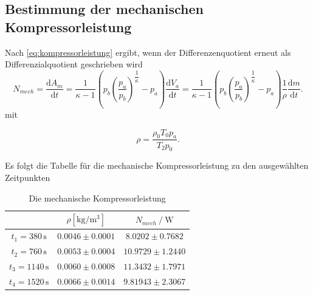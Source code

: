 \subsection{Bestimmung der mechanischen Kompressorleistung}

Nach \eqref{eq:kompressorleistung} ergibt, wenn der Differenzenquotient erneut als Differenzialquotient geschrieben wird
\begin{equation}
N_{mech}= \dfrac{\text{d}A_m}{\text{d}t} = \dfrac{1}{κ-1} \left(p_b\left(\dfrac{p_a}{p_b}\right)^{\dfrac{1}{κ}}-p_a\right) \dfrac{\text{d}V_a}{\text{d}t} = 
    \dfrac{1}{κ-1} \left (p_b \left(\dfrac{p_a}{p_b} \right)^{\dfrac{1}{κ}}-p_a \right) \dfrac{1}{ρ}\dfrac{\text{d}m}{\text{d}t}.
\end{equation}
mit 

\begin{equation*}
\rho = \dfrac{\rho_0 T_0 p_a}{T_2 p_0}.
\end{equation*}

Es folgt die Tabelle für die mechanische Kompressorleistung zu den ausgewählten Zeitpunkten
\begin{table}[H]
  \centering
  \label{tab:kompressorleistung2}
  \begin{tabular}{S S S}
    \toprule
    & {$\rho \left[\unit{\kilo\gram\per\cubic\meter}\right]$}&{$N_{mech} \mathbin{/} \unit{\watt}$} \\
    \midrule
    {$t_1 = 380  \, \unit{\second}$} & {$0.0046 \pm 0.0001$} & {$ 8.0202 \pm 0.7682$} \\
    {$t_2 = 760  \, \unit{\second}$} & {$0.0053 \pm 0.0004$} & {$10.9729 \pm 1.2440$} \\
    {$t_3 = 1140 \, \unit{\second}$} & {$0.0060 \pm 0.0008$} & {$11.3432 \pm 1.7971$} \\
    {$t_4 = 1520 \, \unit{\second}$} & {$0.0066 \pm 0.0014$} & {$9.81943 \pm 2.3067$} \\
    \bottomrule
  \end{tabular}
  \caption{Die mechanische Kompressorleistung}
\end{table}


%




